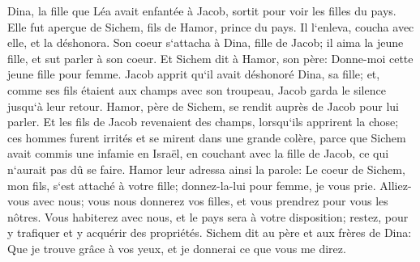 \verse Dina, la fille que Léa avait enfantée à Jacob, sortit pour voir les filles du pays. 
\verse Elle fut aperçue de Sichem, fils de Hamor, prince du pays. Il l`enleva, coucha avec elle, et la déshonora. 
\verse Son coeur s`attacha à Dina, fille de Jacob; il aima la jeune fille, et sut parler à son coeur. 
\verse Et Sichem dit à Hamor, son père: Donne-moi cette jeune fille pour femme. 
\verse Jacob apprit qu`il avait déshonoré Dina, sa fille; et, comme ses fils étaient aux champs avec son troupeau, Jacob garda le silence jusqu`à leur retour. 
\verse Hamor, père de Sichem, se rendit auprès de Jacob pour lui parler. 
\verse Et les fils de Jacob revenaient des champs, lorsqu`ils apprirent la chose; ces hommes furent irrités et se mirent dans une grande colère, parce que Sichem avait commis une infamie en Israël, en couchant avec la fille de Jacob, ce qui n`aurait pas dû se faire. 
\verse Hamor leur adressa ainsi la parole: Le coeur de Sichem, mon fils, s`est attaché à votre fille; donnez-la-lui pour femme, je vous prie. 
\verse Alliez-vous avec nous; vous nous donnerez vos filles, et vous prendrez pour vous les nôtres. 
\verse Vous habiterez avec nous, et le pays sera à votre disposition; restez, pour y trafiquer et y acquérir des propriétés. 
\verse Sichem dit au père et aux frères de Dina: Que je trouve grâce à vos yeux, et je donnerai ce que vous me direz. 
